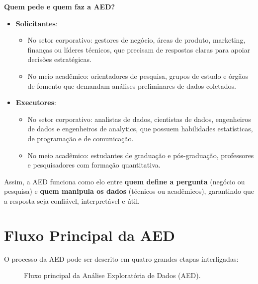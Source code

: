 \textbf{Quem pede e quem faz a AED?}
\begin{itemize}[leftmargin=*]
  \item \textbf{Solicitantes}: 
    \begin{itemize}
      \item No setor corporativo: gestores de negócio, áreas de produto, marketing, finanças ou líderes técnicos, que precisam de respostas claras para apoiar decisões estratégicas.
      \item No meio acadêmico: orientadores de pesquisa, grupos de estudo e órgãos de fomento que demandam análises preliminares de dados coletados.
    \end{itemize}
  \item \textbf{Executores}: 
    \begin{itemize}
      \item No setor corporativo: analistas de dados, cientistas de dados, engenheiros de dados e engenheiros de analytics, que possuem habilidades estatísticas, de programação e de comunicação.
      \item No meio acadêmico: estudantes de graduação e pós-graduação, professores e pesquisadores com formação quantitativa.
    \end{itemize}
\end{itemize}

Assim, a AED funciona como elo entre \textbf{quem define a pergunta} (negócio ou pesquisa) e \textbf{quem manipula os dados} (técnicos ou acadêmicos), garantindo que a resposta seja confiável, interpretável e útil.


\section{Fluxo Principal da AED}
O processo da AED pode ser descrito em quatro grandes etapas interligadas:

\begin{figure}[H]
\centering
{}
\caption{Fluxo principal da Análise Exploratória de Dados (AED).}
\end{figure}

